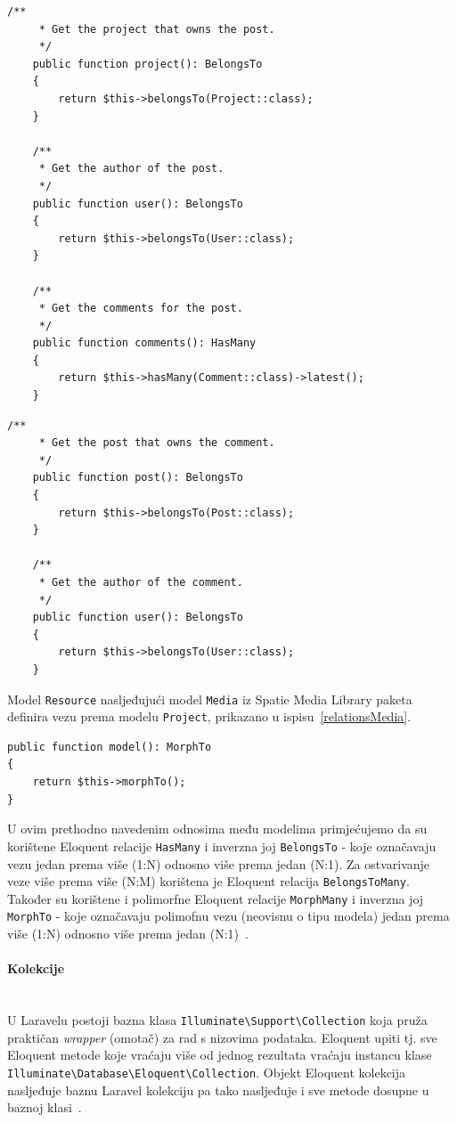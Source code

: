 \begin{lstlisting}[caption={Relacije modela \texttt{Post}}, label=relationsPost]
    /**
     * Get the project that owns the post.
     */
    public function project(): BelongsTo
    {
        return $this->belongsTo(Project::class);
    }

    /**
     * Get the author of the post.
     */
    public function user(): BelongsTo
    {
        return $this->belongsTo(User::class);
    }

    /**
     * Get the comments for the post.
     */
    public function comments(): HasMany
    {
        return $this->hasMany(Comment::class)->latest();
    }
\end{lstlisting}

\begin{lstlisting}[caption={Relacije modela \texttt{Comment}}, label=relationsComment]
    /**
     * Get the post that owns the comment.
     */
    public function post(): BelongsTo
    {
        return $this->belongsTo(Post::class);
    }

    /**
     * Get the author of the comment.
     */
    public function user(): BelongsTo
    {
        return $this->belongsTo(User::class);
    }
\end{lstlisting}

Model \texttt{Resource} nasljeđujući model \texttt{Media} iz Spatie Media Library paketa definira vezu prema modelu \texttt{Project}, prikazano u ispisu~\ref{relationsMedia}.

\begin{lstlisting}[caption={Relacije modela \texttt{Resource} koje nasljeđuje od modela \texttt{Media}}, label=relationsMedia]
public function model(): MorphTo
{
    return $this->morphTo();
}
\end{lstlisting}

U ovim prethodno navedenim odnosima među modelima primjećujemo da su korištene Eloquent relacije \texttt{HasMany} i inverzna joj \texttt{BelongsTo} - koje označavaju vezu jedan prema više (1:N) odnosno više prema jedan (N:1). Za ostvarivanje veze više prema više (N:M) korištena je Eloquent relacija \texttt{BelongsToMany}. Također su korištene i polimorfne Eloquent relacije \texttt{MorphMany} i inverzna joj \texttt{MorphTo} - koje označavaju polimofnu vezu (neovisnu o tipu modela) jedan prema više (1:N) odnosno više prema jedan (N:1)~\cite{relationships}.

\paragraph{Kolekcije}\mbox{}\\
\indent U Laravelu postoji bazna klasa \texttt{Illuminate\textbackslash Support\textbackslash Collection} koja pruža praktičan \textit{wrapper} (omotač) za rad s nizovima podataka. Eloquent upiti tj. sve Eloquent metode koje vraćaju više od jednog rezultata vraćaju instancu klase \\ \texttt{Illuminate\textbackslash Database\textbackslash Eloquent\textbackslash Collection}. Objekt Eloquent kolekcija nasljeđuje baznu Laravel kolekciju pa tako nasljeđuje i sve metode dosupne u baznoj klasi~\cite{eloquentCollections}.

